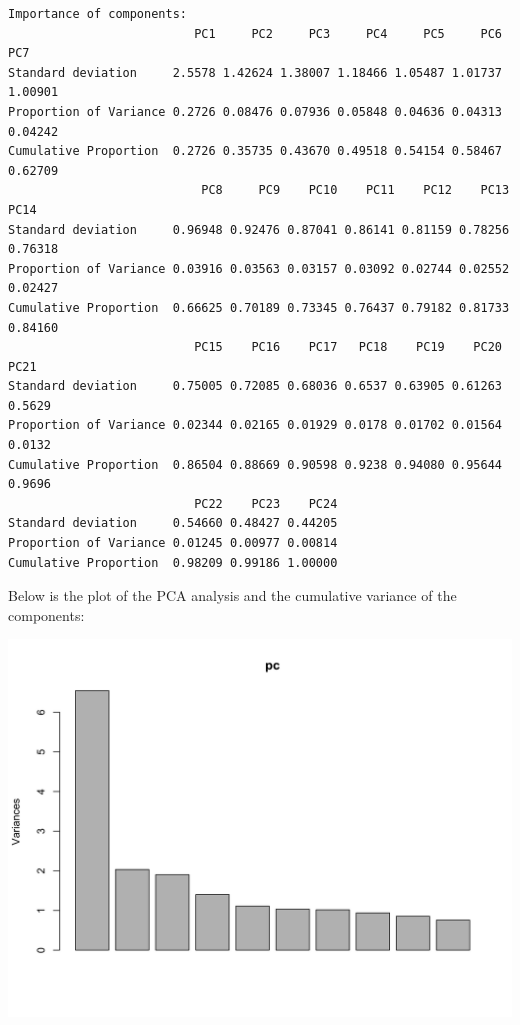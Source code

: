 \documentclass[
  a4paperpaper,
  DIV=11,
  numbers=noendperiod]{scrartcl}
\begin{document}
\begin{verbatim}
Importance of components:
                          PC1     PC2     PC3     PC4     PC5     PC6     PC7
Standard deviation     2.5578 1.42624 1.38007 1.18466 1.05487 1.01737 1.00901
Proportion of Variance 0.2726 0.08476 0.07936 0.05848 0.04636 0.04313 0.04242
Cumulative Proportion  0.2726 0.35735 0.43670 0.49518 0.54154 0.58467 0.62709
                           PC8     PC9    PC10    PC11    PC12    PC13    PC14
Standard deviation     0.96948 0.92476 0.87041 0.86141 0.81159 0.78256 0.76318
Proportion of Variance 0.03916 0.03563 0.03157 0.03092 0.02744 0.02552 0.02427
Cumulative Proportion  0.66625 0.70189 0.73345 0.76437 0.79182 0.81733 0.84160
                          PC15    PC16    PC17   PC18    PC19    PC20   PC21
Standard deviation     0.75005 0.72085 0.68036 0.6537 0.63905 0.61263 0.5629
Proportion of Variance 0.02344 0.02165 0.01929 0.0178 0.01702 0.01564 0.0132
Cumulative Proportion  0.86504 0.88669 0.90598 0.9238 0.94080 0.95644 0.9696
                          PC22    PC23    PC24
Standard deviation     0.54660 0.48427 0.44205
Proportion of Variance 0.01245 0.00977 0.00814
Cumulative Proportion  0.98209 0.99186 1.00000
\end{verbatim}

Below is the plot of the PCA analysis and the cumulative variance of the
components:

\includegraphics{Report_files/figure-pdf/unnamed-chunk-15-1.png}
\end{document}
